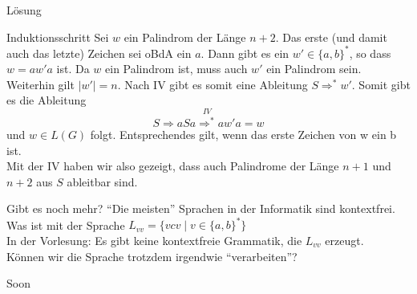 \begin{frame}{Lösung}
		\begin{block}{Induktionsschritt}
			Sei $w$ ein Palindrom der Länge $n + 2$. Das erste (und damit auch das letzte) Zeichen sei oBdA ein $a$. Dann gibt es ein $w' \in \{a, b\}^\ast$, so dass $w = aw'a$ ist. Da $w$ ein Palindrom ist, muss auch $w'$ ein Palindrom sein. Weiterhin gilt $|w'| = n$. \pause Nach IV gibt es somit eine Ableitung $S \Rightarrow^\ast w'$. Somit gibt es die Ableitung $$S \Rightarrow aSa \overset{IV}{\Rightarrow^\ast} aw'a = w$$ und $w \in L(G)$ folgt. \pause Entsprechendes gilt, wenn das erste Zeichen von w ein b ist. \\
			Mit der IV haben wir also gezeigt, dass auch Palindrome der Länge $n+1$ und $n+2$ aus $S$ ableitbar sind.
	\end{block}

\end{frame}

\begin{frame}{Gibt es noch mehr?}
	\enquote{Die meisten} Sprachen in der Informatik sind kontextfrei.\\[1em]
	Was ist mit der Sprache $L_{vv} = \{vcv \mid v \in \{a, b\}^*\}$\\
	\pause
	In der Vorlesung: Es gibt keine kontextfreie Grammatik, die $L_{vv}$ erzeugt.\\
	\pause
	Können wir die Sprache trotzdem irgendwie \enquote{verarbeiten}?
	
	\begin{block}{}
		\Large
		\centering
		Soon\\[1em]
	\end{block}
\end{frame}
